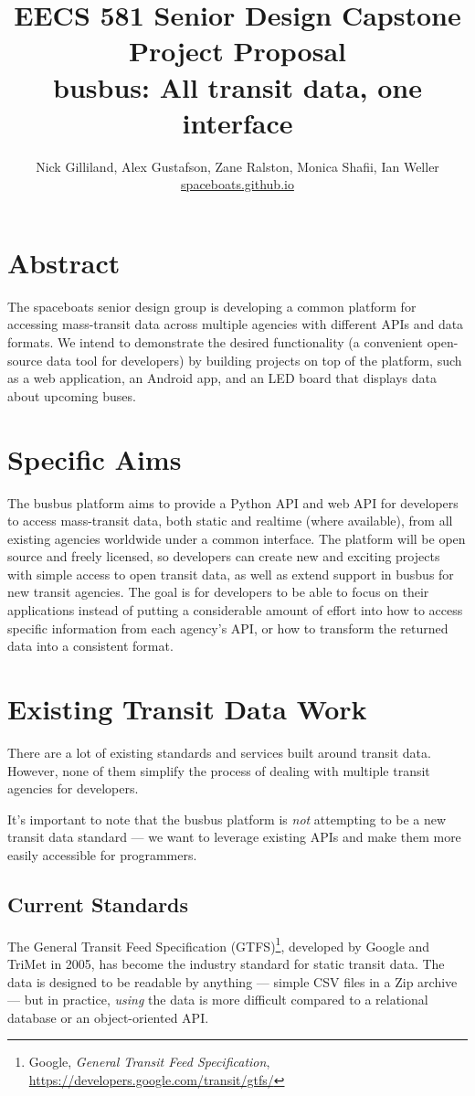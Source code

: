 \documentclass[12pt]{article}
\title{EECS 581 Senior Design Capstone Project Proposal \\
busbus: All transit data, one interface}
\author{Nick Gilliland, Alex Gustafson, Zane Ralston, Monica Shafii, Ian Weller \\ \url{spaceboats.github.io}}
\begin{document}
\maketitle

\section{Abstract}

The spaceboats senior design group is developing a common platform for accessing mass-transit data
across multiple agencies with different APIs and data formats.
We intend to demonstrate the desired functionality (a convenient open-source data tool
for developers) by building projects on top of the platform, such as a web application, an Android app, and
an LED board that displays data about upcoming buses.

\section{Specific Aims}

The busbus platform aims to provide a Python API and web API for developers to access
mass-transit data, both static and realtime (where available), from all existing agencies worldwide
under a common interface.
The platform will be open source and freely licensed, so developers can create new and exciting projects
with simple access to open transit data, as well as extend support in busbus for new transit agencies.
The goal is for
developers to be able to focus on their applications instead of putting a considerable amount of
effort into how to access specific information from each agency's API, or how to transform
the returned data into a consistent format.

\section{Existing Transit Data Work}
There are a lot of existing standards and services built around transit data.
However, none of them simplify the process of dealing with multiple transit agencies for developers.

It's important to note that the busbus platform is \textit{not} attempting to be a new transit data standard ---
we want to leverage existing APIs and make them more easily accessible for programmers.

\subsection{Current Standards}
The General Transit Feed Specification (GTFS)\footnote{Google, \textit{General Transit Feed Specification},
\url{https://developers.google.com/transit/gtfs/}},
developed by Google and TriMet in 2005, has become the industry standard for static transit data.
The data is designed to be readable by anything --- simple CSV files in a Zip archive ---
but in practice, \textit{using} the data is more difficult compared to a relational database
or an object-oriented API.
\end{document}
